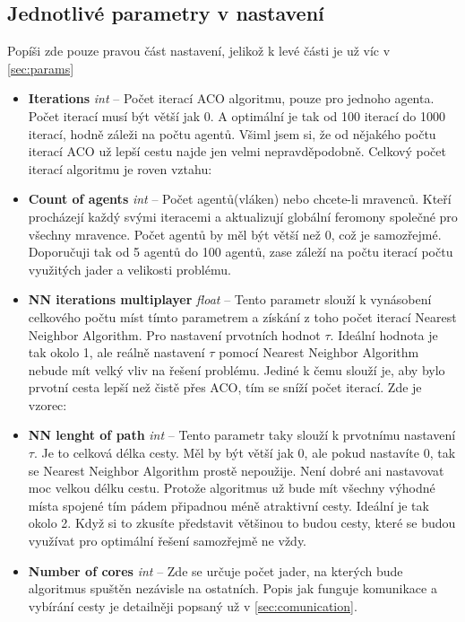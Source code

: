 \subsection{Jednotlivé parametry v nastavení}
Popíši zde pouze pravou část nastavení, jelikož k levé části je už víc v \ref{sec:params}
\begin{itemize}
    \item \textbf{Iterations} \textit{int} -- Počet iterací ACO algoritmu, pouze pro jednoho agenta. Počet iterací musí být větší jak 0. A optimální je tak od 100 iterací do 1000 iterací, hodně záleži na počtu agentů. Všiml jsem si, že od nějakého počtu iterací ACO už lepší cestu najde jen velmi nepravděpodobně. Celkový počet iterací algoritmu je roven vztahu:
    \begin{center}
     \end{center}
     
    \item \textbf{Count of agents} \textit{int} -- Počet agentů(vláken) nebo chcete-li mravenců. Kteří procházejí každý svými iteracemi a aktualizují globální feromony společné pro všechny mravence. Počet agentů by měl být větší než 0, což je samozřejmé. Doporučuji tak od 5 agentů do 100 agentů, zase záleží na počtu iterací počtu využitých jader a velikosti problému. 
    \item \textbf{NN iterations multiplayer} \textit{float} -- Tento parametr slouží k vynásobení celkového počtu míst tímto parametrem a získání z toho počet iterací Nearest Neighbor Algorithm. Pro nastavení prvotních hodnot $\tau$. Ideální hodnota je tak okolo 1, ale reálně nastavení $\tau$ pomocí Nearest Neighbor Algorithm nebude mít velký vliv na řešení problému. Jediné k čemu slouží je, aby bylo prvotní cesta lepší než čistě přes ACO, tím se sníží počet iterací. Zde je vzorec: 
    \begin{center}
     \end{center}
        
    \item \textbf{NN lenght of path} \textit{int} -- Tento parametr taky slouží k prvotnímu nastavení $\tau$. Je to celková délka cesty. Měl by být větší jak 0, ale pokud nastavíte 0, tak se Nearest Neighbor Algorithm prostě nepoužije. Není dobré ani nastavovat moc velkou délku cestu. Protože algoritmus už bude mít všechny výhodné místa spojené tím pádem připadnou méně atraktivní cesty. Ideální je tak okolo 2. Když si to zkusíte představit většinou to budou cesty, které se budou využívat pro optimální řešení samozřejmě ne vždy. 
    \item \textbf{Number of cores} \textit{int} -- Zde se určuje počet jader, na kterých bude algoritmus spuštěn nezávisle na ostatních. Popis jak funguje komunikace a vybírání cesty je detailněji popsaný už v \ref{sec:comunication}.
\end{itemize}



